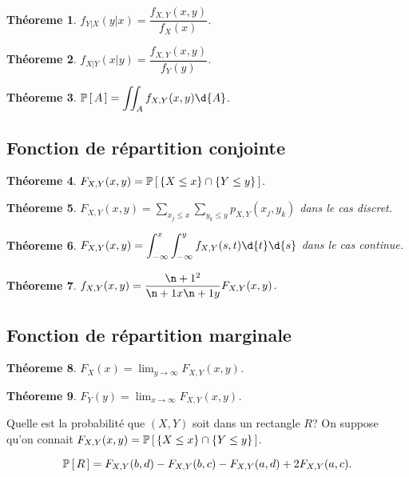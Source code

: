 \documentclass[11pt]{article}
\renewcommand\P[1]{%
	\ensuremath{%
		\mathbb{P}\left[\,#1\,\right]%
	}%
}%
\newtheorem{theoreme}{Théoreme}[section]
\begin{document}
\begin{theoreme}
	$f_{Y|X}(y|x)=\dfrac{f_{X,Y}(x,y)}{f_X(x)}$.
\end{theoreme}

\begin{theoreme}
	$f_{X|Y}(x|y)=\dfrac{f_{X,Y}(x,y)}{f_Y(y)}$.
\end{theoreme}

\begin{theoreme}
	$\P{A}=\displaystyle\iint_Af_{X,Y}(x,y)\d{A}$.
\end{theoreme}

\subsection{Fonction de répartition conjointe}
\begin{theoreme}
	$F_{X,Y}(x,y)=\P{\left\{X\leq x\right\}\cap\left\{Y\leq y\right\}}$.
\end{theoreme}

\begin{theoreme}
	$F_{X,Y}(x,y)=\displaystyle\sum_{x_j\leq x}
	\displaystyle\sum_{y_k\leq y}p_{X,Y}(x_j,y_k)$ dans le cas discret.
\end{theoreme}

\begin{theoreme}
	$F_{X,Y}(x,y)=\displaystyle\int_{-\infty}^x
	\displaystyle\int_{-\infty}^yf_{X,Y}(s,t)\d{t}\d{s}$ dans le cas continue.
\end{theoreme}

\begin{theoreme}
	$f_{X,Y}(x,y)=\dfrac{\p{}^2}{\p{x}\p{y}}F_{X,Y}(x,y)$.
\end{theoreme}

\subsection{Fonction de répartition marginale}
\begin{theoreme}
	$F_X(x)=\displaystyle\lim_{y\rightarrow\infty}F_{X,Y}(x,y)$.
\end{theoreme}

\begin{theoreme}
	$F_Y(y)=\displaystyle\lim_{x\rightarrow\infty}F_{X,Y}(x,y)$.
\end{theoreme}

\begin{exemple}
	Quelle est la probabilité que $(X,Y)$ soit dans un rectangle $R$? On
	suppose qu'on connait $F_{X,Y}(x,y)=\P{\left\{X\leq x\right\}\cap
	\left\{Y\leq y\right\}}$.

	\begin{equation*}
		\P{R}
		=F_{X,Y}(b,d)-F_{X,Y}(b,c)-F_{X,Y}(a,d)+2F_{X,Y}(a,c).
	\end{equation*}
\end{exemple}
\end{document}
